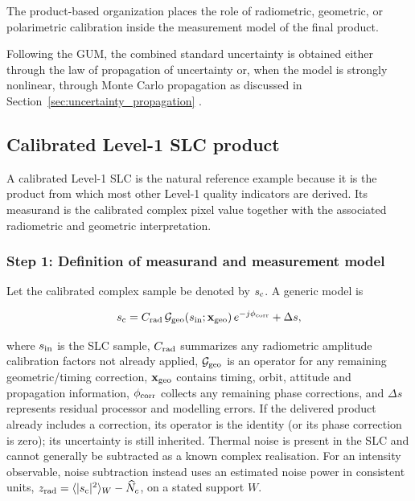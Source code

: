 The product-based organization places the role of radiometric, geometric, or
polarimetric calibration inside the measurement model of the final product.

Following the \ac{GUM}, the combined standard uncertainty is obtained either
through the law of propagation of uncertainty or, when the model is strongly
nonlinear, through Monte Carlo propagation as discussed in
Section~\ref{sec:uncertainty_propagation} . 

\subsection{Calibrated Level-1 SLC product}

A calibrated Level-1 \ac{SLC} is the natural reference example because it is the product from which most other Level-1 quality indicators are derived. Its measurand is the calibrated complex pixel value together with the associated radiometric and geometric interpretation.

\subsubsection{Step 1: Definition of measurand and measurement model}

Let the calibrated complex sample be denoted by $s_{\rm c}$. A generic model is

\begin{equation}
  s_{\rm c} = C_{\rm rad}\,\mathcal G_{\rm geo}\!\left(s_{\rm in};\mathbf x_{\rm geo}\right) e^{-j\phi_{\rm corr}} + \Delta s,
  \label{eq:slc_model}
\end{equation}

where $s_{\rm in}$ is the SLC sample,
$C_{\rm rad}$ summarizes any radiometric amplitude calibration factors not
already applied, $\mathcal G_{\rm geo}$ is an operator for any remaining
geometric/timing correction, $\mathbf x_{\rm geo}$ contains timing, orbit,
attitude and propagation information, $\phi_{\rm corr}$ collects any remaining
phase corrections, and $\Delta s$ represents residual processor and modelling
errors. If the delivered product already includes a correction, its operator
is the identity (or its phase correction is zero); its uncertainty is still
inherited. Thermal noise is present in the SLC and cannot generally be
subtracted as a known complex realisation. For an intensity observable,
noise subtraction instead uses an estimated noise power in consistent units,
$z_{\rm rad}=\langle|s_{\rm c}|^2\rangle_W-\widehat N_c$, on a stated support $W$.


